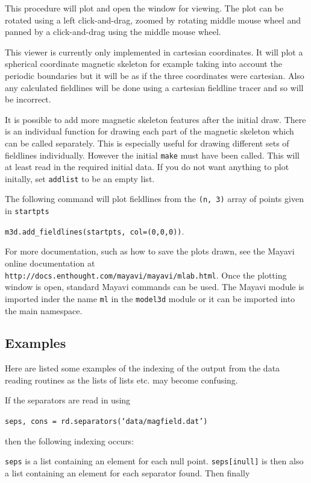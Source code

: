 \documentclass[12pt]{article}
\begin{document}
      This procedure will plot and open the window for viewing. The plot can be rotated using a left click-and-drag, zoomed by rotating middle mouse wheel and panned by a click-and-drag using the middle mouse wheel.

      This viewer is currently only implemented in cartesian coordinates. It will plot a spherical coordinate magnetic skeleton for example taking into account the periodic boundaries but it will be as if the three coordinates were cartesian. Also any calculated fieldlines will be done using a cartesian fieldline tracer and so will be incorrect.

      It is possible to add more magnetic skeleton features after the initial draw. There is an individual function for drawing each part of the magnetic skeleton which can be called separately. This is especially useful for drawing different sets of fieldlines individually. However the initial \texttt{make} must have been called. This will at least read in the required initial data. If you do not want anything to plot initally, set \texttt{addlist} to be an empty list.

      The following command will plot fieldlines from the \texttt{(n, 3)} array of points given in \texttt{startpts}

      \texttt{m3d.add\_fieldlines(startpts, col=(0,0,0))}.

      For more documentation, such as how to save the plots drawn, see the Mayavi online documentation at \texttt{http://docs.enthought.com/mayavi/mayavi/mlab.html}. Once the plotting window is open, standard Mayavi commands can be used. The Mayavi module is imported inder the name \texttt{ml} in the \texttt{model3d} module or it can be imported into the main namespace.

      \subsection{Examples}

      Here are listed some examples of the indexing of the output from the data reading routines as the lists of lists etc. may become confusing.

      If the separators are read in using

      \texttt{seps, cons = rd.separators(`data/magfield.dat')}

      then the following indexing occurs:

      \texttt{seps} is a list containing an element for each null point. \texttt{seps[inull]} is then also a list containing an element for each separator found. Then finally
\end{document}
